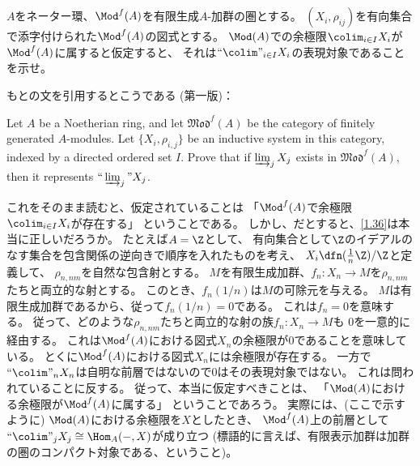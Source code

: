 \documentclass[uplatex,dvipdfmx]{jsarticle}
\begin{document}
\maketitle\HeaderCommentA
\section{}
\fi


\begin{prob}\label{1.36}
  \(A\)をネーター環、\(\Mod^f(A)\)を有限生成\(A\)-加群の圏とする。
  \((X_i,\rho_{ij})\)を有向集合で添字付けられた\(\Mod^f(A)\)の図式とする。
  \(\Mod(A)\)での余極限\(\colim_{i\in I}X_i\)が
  \(\Mod^f(A)\)に属すると仮定すると、
  それは\(``\colim"_{i\in I}X_i\)の表現対象であることを示せ。
\end{prob}

\begin{rem*}
  もとの文を引用するとこうである (第一版)：

  Let \(A\) be a Noetherian ring, and
  let \(\mathfrak{Mod}^f(A)\) be the category of finitely generated \(A\)-modules.
  Let \(\{X_i,\rho_{i,j}\}\) be an inductive system in this category,
  indexed by a directed ordered set \(I\).
  Prove that if \(\varinjlim_{j} X_j\) exists in \(\mathfrak{Mod}^f(A)\),
  then it represents \(``\varinjlim_j" X_j\).

  これをそのまま読むと、仮定されていることは
  「\(\Mod^f(A)\)で余極限\(\colim_{i\in I}X_i\)が存在する」
  ということである。
  しかし、だとすると、\autoref{1.36}は本当に正しいだろうか。
  たとえば\(A=\Z\)として、
  有向集合として\(\Z\)のイデアルのなす集合を包含関係の逆向きで順序を入れたものを考え、
  \(X_i\dfn (\frac{1}{n}\Z)/\Z\)と定義して、
  \(\rho_{n,nm}\)を自然な包含射とする。
  \(M\)を有限生成加群、\(f_n:X_n\to M\)を\(\rho_{n,nm}\)たちと両立的な射とする。
  このとき、\(f_n(1/n)\)は\(M\)の可除元を与える。
  \(M\)は有限生成加群であるから、従って\(f_n(1/n)=0\)である。
  これは\(f_n=0\)を意味する。
  従って、どのような\(\rho_{n,nm}\)たちと両立的な射の族\(f_n:X_n\to M\)も
  \(0\)を一意的に経由する。
  これは\(\Mod^f(A)\)における図式\(X_n\)の余極限が\(0\)であることを意味している。
  とくに\(\Mod^f(A)\)における図式\(X_n\)には余極限が存在する。
  一方で\(``\colim"_n X_n\)は自明な前層ではないので\(0\)はその表現対象ではない。
  これは問われていることに反する。
  従って、本当に仮定すべきことは、
  「\(\Mod(A)\)における余極限が\(\Mod^f(A)\)に属する」
  ということであろう。
  実際には、(ここで示すように)
  \(\Mod(A)\)における余極限を\(X\)としたとき、
  \(\Mod^f(A)\)上の前層として
  \(``\colim"_j X_j \cong \Hom_A(-,X)\)が成り立つ
  (標語的に言えば、有限表示加群は加群の圏のコンパクト対象である、ということ)。
\end{rem*}
\end{document}
